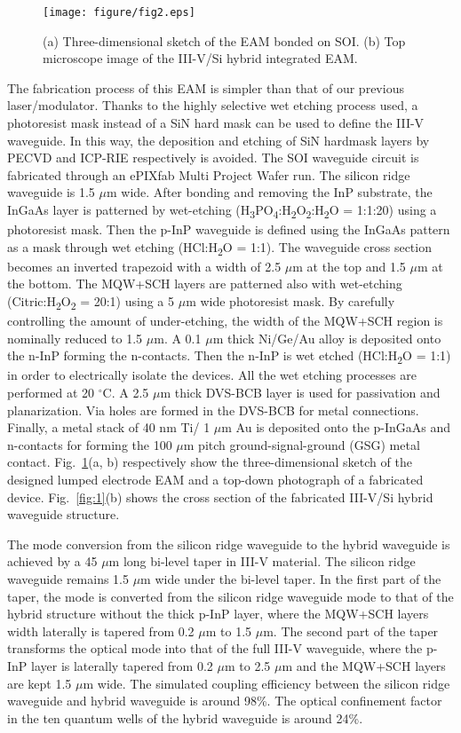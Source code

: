 \documentclass[aip,apl,reprint,a4paper]{revtex4-1}
\def\SB#1{\textsubscript{#1}}
\begin{document}
\begin{figure}
	\texttt{[image: figure/fig2.eps]}%
	\caption{\label{fig:2} (a) Three-dimensional sketch of the EAM bonded on SOI. (b) Top microscope image of the III-V/Si hybrid integrated EAM.}
\end{figure}


The fabrication process of this EAM is simpler than that of our previous laser/modulator.\cite{Transceiver,roelkensiii-v-on-silicon2015,fu52015} Thanks to the highly selective wet etching process used, a photoresist mask instead of a SiN hard mask can be used to define the III-V waveguide. In this way, the deposition and etching of SiN hardmask layers by PECVD and ICP-RIE respectively is avoided. The SOI waveguide circuit is fabricated through an ePIXfab Multi Project Wafer run.\cite{epixfab} The silicon ridge waveguide is 1.5 $\mu$m wide. After bonding and removing the InP substrate, the InGaAs layer is patterned by wet-etching (H\SB{3}PO\SB{4}:H\SB{2}O\SB{2}:H\SB{2}O = 1:1:20) using a photoresist mask. Then the p-InP waveguide is defined using the InGaAs pattern as a mask through wet etching (HCl:H\SB{2}O = 1:1). The waveguide cross section becomes an inverted trapezoid with a width of 2.5 $\mu$m at the top and 1.5 $\mu$m at the bottom. The MQW+SCH layers are patterned also with wet-etching (Citric:H\SB{2}O\SB{2} = 20:1) using a 5 $\mu$m wide photoresist mask.  By carefully controlling the amount of under-etching, the width of the MQW+SCH region is nominally reduced to 1.5 $\mu$m. A 0.1 $\mu$m thick Ni/Ge/Au alloy is deposited onto the n-InP forming the n-contacts. Then the n-InP is wet etched (HCl:H\SB{2}O = 1:1) in order to electrically isolate the devices. All the wet etching processes are performed at 20 $^{\circ}$C. A 2.5 $\mu$m thick DVS-BCB layer is used for passivation and planarization. Via holes are formed in the DVS-BCB for metal connections. Finally, a metal stack of 40 nm Ti/ 1 $\mu$m Au is deposited onto the p-InGaAs and n-contacts for forming the 100 $\mu$m pitch ground-signal-ground (GSG) metal contact. Fig.~\ref{fig:2}(a, b) respectively show the three-dimensional sketch of the designed lumped electrode EAM and a top-down photograph of a fabricated device. Fig.~\ref{fig:1}(b) shows the cross section of the fabricated III-V/Si hybrid waveguide structure.


The mode conversion from the silicon ridge waveguide to the hybrid waveguide is achieved by a 45 $\mu$m long bi-level taper in III-V material.\cite{fu52015,huang2015ultracompact} The silicon ridge waveguide remains 1.5 $\mu$m wide under the bi-level taper. In the first part of the taper, the mode is converted from the silicon ridge waveguide mode to that of the hybrid structure without the thick p-InP layer, where the MQW+SCH layers width laterally is tapered from 0.2 $\mu$m to 1.5 $\mu$m. The second part of the taper transforms the optical mode into that of the full III-V waveguide, where the p-InP layer is laterally tapered from 0.2 $\mu$m to 2.5 $\mu$m and the MQW+SCH layers are kept 1.5 $\mu$m wide. The simulated coupling efficiency between the silicon ridge waveguide and hybrid waveguide is around 98\%. The optical confinement factor in the ten quantum wells of the hybrid waveguide is around 24\%.
\end{document}
